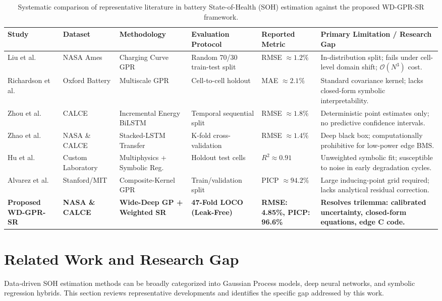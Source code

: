 \documentclass[a4paper,fleqn]{cas-sc}
\begin{document}
\begin{table}[t]
\centering
\caption{Systematic comparison of representative literature in battery State-of-Health (SOH) estimation against the proposed WD-GPR-SR framework.}
\label{tab:literature_comparison}
\footnotesize
\renewcommand{\arraystretch}{1.2}
\begin{tabular*}{\textwidth}{@{\extracolsep{\fill}}llllll@{}}
\toprule
\textbf{Study} & \textbf{Dataset} & \textbf{Methodology} & \textbf{Evaluation Protocol} & \textbf{Reported Metric} & \textbf{Primary Limitation / Research Gap} \\
\midrule
Liu et al.~\cite{liu2018novel} & NASA Ames & Charging Curve GPR & Random 70/30 train-test split & RMSE $\approx 1.2\%$ & In-distribution split; fails under cell-level domain shift; $\mathcal{O}(N^3)$ cost. \\
Richardson et al.~\cite{richardson2019multiscale} & Oxford Battery & Multiscale GPR & Cell-to-cell holdout & MAE $\approx 2.1\%$ & Standard covariance kernel; lacks closed-form symbolic interpretability. \\
Zhou et al.~\cite{zhou2023bilstm} & CALCE & Incremental Energy BiLSTM & Temporal sequential split & RMSE $\approx 1.8\%$ & Deterministic point estimates only; no predictive confidence intervals. \\
Zhao et al.~\cite{zhao2024stacked} & NASA \& CALCE & Stacked-LSTM Transfer & K-fold cross-validation & RMSE $\approx 1.4\%$ & Deep black box; computationally prohibitive for low-power edge BMS. \\
Hu et al.~\cite{hu2026multiphysics} & Custom Laboratory & Multiphysics + Symbolic Reg. & Holdout test cells & $R^2 \approx 0.91$ & Unweighted symbolic fit; susceptible to noise in early degradation cycles. \\
Alvarez et al.~\cite{alvarez2026uncertainty} & Stanford/MIT & Composite-Kernel GPR & Train/validation split & PICP $\approx 94.2\%$ & Large inducing-point grid required; lacks analytical residual correction. \\
\textbf{Proposed WD-GPR-SR} & \textbf{NASA \& CALCE} & \textbf{Wide-Deep GP + Weighted SR} & \textbf{47-Fold LOCO (Leak-Free)} & \textbf{RMSE: 4.85\%, PICP: 96.6\%} & \textbf{Resolves trilemma: calibrated uncertainty, closed-form equations, edge C code.} \\
\bottomrule
\end{tabular*}
\end{table}

\section{Related Work and Research Gap}
Data-driven SOH estimation methods can be broadly categorized into Gaussian Process models, deep neural networks, and symbolic regression hybrids. This section reviews representative developments and identifies the specific gap addressed by this work.
\end{document}

